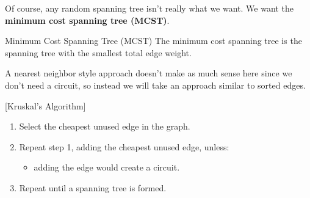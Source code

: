Of course, any random spanning tree isn't really what we want.  We want the \textbf{minimum cost spanning tree (MCST)}.

\begin{definition}{Minimum Cost Spanning Tree (MCST)}{}
The minimum cost spanning tree is the spanning tree with the smallest total edge weight.  
\end{definition}


A nearest neighbor style approach doesn't make as much sense here since we don't need a circuit, so instead we will take an approach similar to sorted edges.

\begin{algorithm}{}{}[Kruskal's Algorithm]
\hspace{3in}
\begin{enumerate}
\item Select the cheapest unused edge in the graph.
\item Repeat step 1, adding the cheapest unused edge, unless:
\begin{itemize}
\item adding the edge would create a circuit.
\end{itemize}
\item Repeat until a spanning tree is formed.
\end{enumerate}
\end{algorithm}



